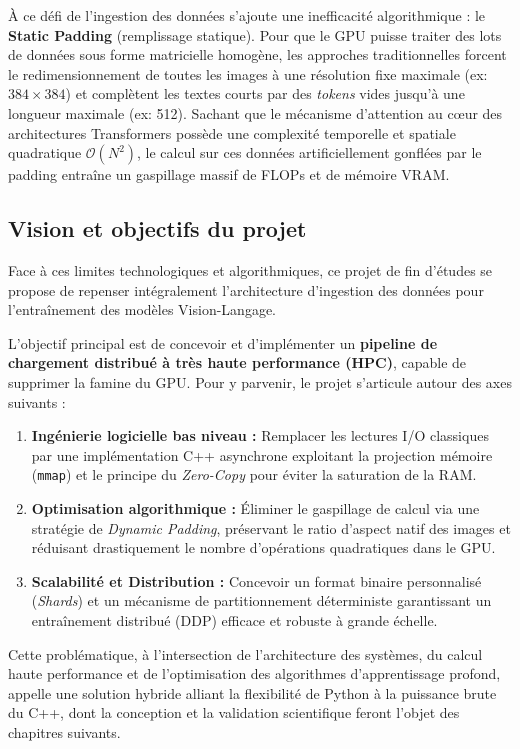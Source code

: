 \documentclass[12pt,a4paper]{report}
\begin{document}
À ce défi de l'ingestion des données s'ajoute une inefficacité algorithmique : le \textbf{Static Padding} (remplissage statique). Pour que le GPU puisse traiter des lots de données sous forme matricielle homogène, les approches traditionnelles forcent le redimensionnement de toutes les images à une résolution fixe maximale (ex: $384 \times 384$) et complètent les textes courts par des \textit{tokens} vides jusqu'à une longueur maximale (ex: 512). Sachant que le mécanisme d'attention au cœur des architectures Transformers possède une complexité temporelle et spatiale quadratique $\mathcal{O}(N^2)$, le calcul sur ces données artificiellement gonflées par le padding entraîne un gaspillage massif de FLOPs et de mémoire VRAM.

\subsection{Vision et objectifs du projet}

Face à ces limites technologiques et algorithmiques, ce projet de fin d'études se propose de repenser intégralement l'architecture d'ingestion des données pour l'entraînement des modèles Vision-Langage. 

L'objectif principal est de concevoir et d'implémenter un \textbf{pipeline de chargement distribué à très haute performance (HPC)}, capable de supprimer la famine du GPU. Pour y parvenir, le projet s'articule autour des axes suivants :
\begin{enumerate}
    \item \textbf{Ingénierie logicielle bas niveau :} Remplacer les lectures I/O classiques par une implémentation C++ asynchrone exploitant la projection mémoire (\texttt{mmap}) et le principe du \textit{Zero-Copy} pour éviter la saturation de la RAM.
    \item \textbf{Optimisation algorithmique :} Éliminer le gaspillage de calcul via une stratégie de \textit{Dynamic Padding}, préservant le ratio d'aspect natif des images et réduisant drastiquement le nombre d'opérations quadratiques dans le GPU.
    \item \textbf{Scalabilité et Distribution :} Concevoir un format binaire personnalisé (\textit{Shards}) et un mécanisme de partitionnement déterministe garantissant un entraînement distribué (DDP) efficace et robuste à grande échelle.
\end{enumerate}

Cette problématique, à l'intersection de l'architecture des systèmes, du calcul haute performance et de l'optimisation des algorithmes d'apprentissage profond, appelle une solution hybride alliant la flexibilité de Python à la puissance brute du C++, dont la conception et la validation scientifique feront l'objet des chapitres suivants.
\end{document}
